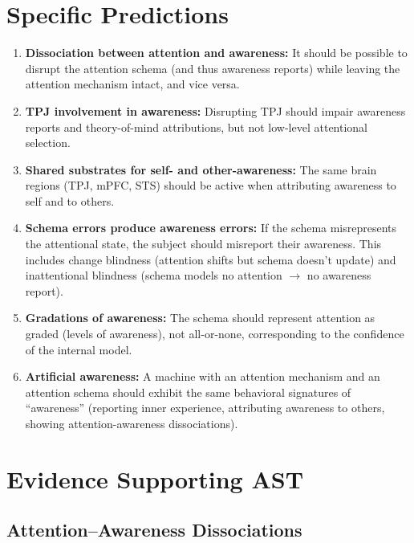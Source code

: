 \documentclass[11pt,a4paper]{report}
\begin{document}
\section{Specific Predictions}

\begin{predbox}
\begin{enumerate}[leftmargin=1.5em]
  \item \textbf{Dissociation between attention and awareness:} It should be possible to disrupt the attention schema (and thus awareness reports) while leaving the attention mechanism intact, and vice versa.
  \item \textbf{TPJ involvement in awareness:} Disrupting TPJ should impair awareness reports and theory-of-mind attributions, but not low-level attentional selection.
  \item \textbf{Shared substrates for self- and other-awareness:} The same brain regions (TPJ, mPFC, STS) should be active when attributing awareness to self and to others.
  \item \textbf{Schema errors produce awareness errors:} If the schema misrepresents the attentional state, the subject should misreport their awareness. This includes change blindness (attention shifts but schema doesn't update) and inattentional blindness (schema models no attention $\to$ no awareness report).
  \item \textbf{Gradations of awareness:} The schema should represent attention as graded (levels of awareness), not all-or-none, corresponding to the confidence of the internal model.
  \item \textbf{Artificial awareness:} A machine with an attention mechanism and an attention schema should exhibit the same behavioral signatures of ``awareness'' (reporting inner experience, attributing awareness to others, showing attention-awareness dissociations).
\end{enumerate}
\end{predbox}

\section{Evidence Supporting AST}

\subsection{Attention--Awareness Dissociations}
\end{document}
